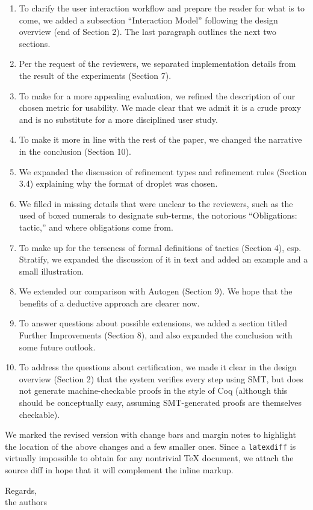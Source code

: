 \documentclass{article}
\begin{document}
\begin{enumerate}
  \item To clarify the user interaction workflow and prepare the reader
    for what is to come, we added a subsection ``Interaction Model''
    following the design overview (end of Section 2).
    The last paragraph outlines the next two sections.
  \item Per the request of the reviewers, we separated implementation details
    from the result of the experiments (Section 7).
  \item To make for a more appealing evaluation, we refined the description
    of our chosen metric for usability. We made clear that we admit it is
    a crude proxy and is no substitute for a more disciplined user study.
  \item To make it more in line with the rest of the paper, we changed
    the narrative in the conclusion (Section 10).
  \item We expanded the discussion of refinement types and refinement rules
    (Section 3.4) explaining why the format of droplet was chosen.
  \item We filled in missing details that were unclear to the reviewers,
    such as the used of boxed numerals to designate sub-terms, the notorious
    ``Obligations: tactic,'' and where obligations come from.
  \item To make up for the terseness of formal definitions of tactics (Section 4),
    esp. \textsf{Stratify}, we expanded the discussion of it in text and
    added an example and a small illustration.
  \item We extended our comparison with Autogen (Section 9). We hope that
    the benefits of a deductive approach are clearer now.
  \item To answer questions about possible extensions, we added a section
    titled Further Improvements (Section 8), and also expanded the conclusion
    with some future outlook.
  \item To address the questions about certification, we made it clear in the
    design overview (Section 2) that the system verifies every step using SMT,
    but does not generate machine-checkable proofs in the style of Coq
    (although this should be conceptually easy, assuming SMT-generated proofs are themselves checkable).
\end{enumerate}

We marked the revised version with change bars and margin notes to highlight
the location of the above changes and a few smaller ones.
Since a \texttt{latexdiff} is virtually impossible to obtain for any nontrivial \TeX{} document,
we attach the source diff in hope that it will complement the inline markup.

\bigskip\noindent
Regards,\\
the authors
\end{document}
